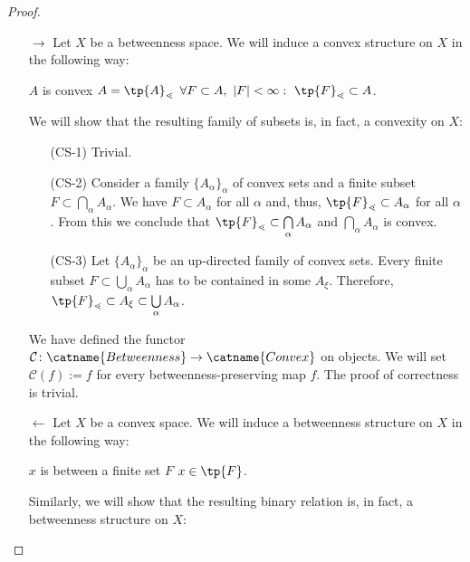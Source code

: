 \documentclass[12pt, a4paper]{article}
\newcommand{\btw}{\lessdot}
\begin{document}
\begin{proof}~
\begin{itemize}
    \item[$\longrightarrow$] Let \(X\) be a betweenness space. We will induce a convex structure on \(X\) in the following way:
    
    \begin{center}
        \(A\) is convex \Equ \(A = \tp{A}_\btw\) \Equ \(\forall F \subset A, \ |F| < \infty : \ \tp{F}_\btw \subset A\).
    \end{center}

    We will show that the resulting family of subsets is, in fact, a convexity on \(X\):

    \begin{itemize}
        \item[(CS-1)] Trivial.
        \item[(CS-2)] Consider a family \(\{A_\alpha\}_\alpha\) of convex sets and a finite subset \(F \subset \bigcap\limits_\alpha A_\alpha\). We have \(F \subset A_\alpha\) for all \(\alpha\) and, thus, \(\tp{F}_\btw \subset A_\alpha\) for all \(\alpha\). From this we conclude that \(\tp{F}_\btw \subset \bigcap\limits_\alpha A_\alpha\) and \(\bigcap\limits_\alpha A_\alpha\) is convex.
        \item[(CS-3)] Let \(\{A_\alpha\}_\alpha\) be an up-directed family of convex sets. Every finite subset \(F \subset \bigcup\limits_\alpha A_\alpha\) has to be contained in some \(A_\xi\). Therefore, \(\tp{F}_\btw \subset A_\xi \subset \bigcup\limits_\alpha A_\alpha\).
    \end{itemize}

    We have defined the functor \(\mathcal{C} \colon \catname{Betweenness} \to \catname{Convex}\) on objects. We will set \(\mathcal{C}(f) := f\) for every betweenness-preserving map \(f\). The proof of correctness is trivial.\\

    \item[$\longleftarrow$] Let \(X\) be a convex space. We will induce a betweenness structure on \(X\) in the following way:

    \begin{center}
        \(x\) is between a finite set \(F\) \Equ \(x \in \tp{F}\).
    \end{center}

    Similarly, we will show that the resulting binary relation is, in fact, a betweenness structure on \(X\):


\end{itemize}
\end{proof}
\end{document}
